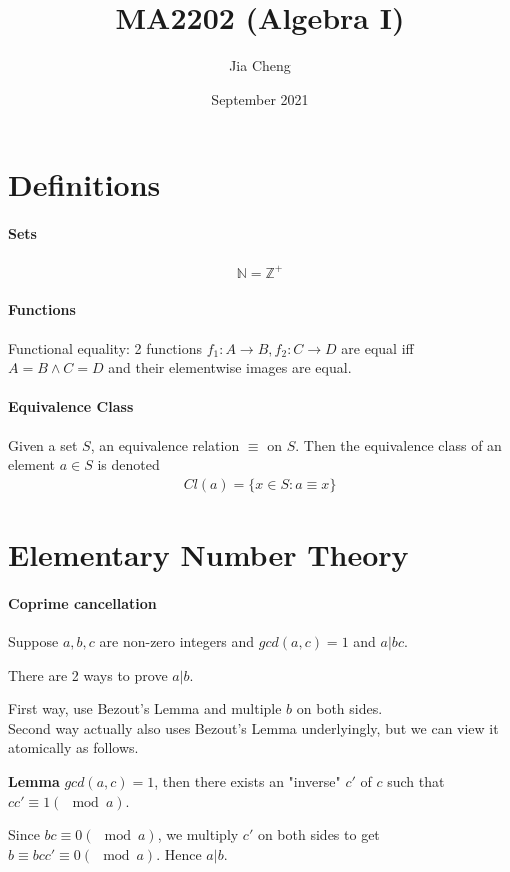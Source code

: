 \documentclass{article}
\title{MA2202 (Algebra I)}
\author{Jia Cheng}
\date{September 2021}
\begin{document}
\maketitle

\section{Definitions}
\paragraph{Sets}
\begin{align*}
	\mathbb{N}=\mathbb{Z}^+
\end{align*}
\paragraph{Functions}\mbox{}

Functional equality: 2 functions $f_1:A\rightarrow B, f_2:C\rightarrow D$ are equal iff $A=B\land C=D$ and their elementwise images are equal.

\paragraph{Equivalence Class}\mbox{}
Given a set $S$, an equivalence relation $\equiv$ on $S$. Then the equivalence class of an element $a\in S$ is denoted
\begin{align*}
	Cl(a) = \{x\in S : a\equiv x\}
\end{align*}

\section{Elementary Number Theory}
\paragraph{Coprime cancellation} Suppose $a,b,c$ are non-zero integers and $gcd(a,c)=1$ and $a|bc$.

There are 2 ways to prove $a|b$.

First way, use Bezout's Lemma and multiple $b$ on both sides.\\
Second way actually also uses Bezout's Lemma underlyingly, but we can view it atomically as follows.

\textbf{Lemma} $gcd(a,c)=1$, then there exists an "inverse" $c'$ of $c$ such that $cc'\equiv 1 (\mod a)$.

Since $bc\equiv 0 (\mod a)$, we multiply $c'$ on both sides to get $b\equiv bcc'\equiv 0(\mod a)$. Hence $a|b$.
\end{document}
